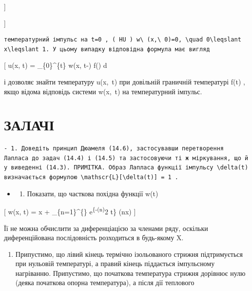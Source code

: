 \documentclass[
  ukrainian,
]{article}
\providecommand{\tightlist}{%
  \setlength{\itemsep}{0pt}\setlength{\parskip}{0pt}}
\begin{document}
{]}

{]}

\begin{verbatim}
температурний імпульс на t=0 , ( HU ) w\ (x,\ 0)=0, \quad 0\leqslant x\leqslant 1. У цьому випадку відповідна формула має вигляд
\end{verbatim}

{[} u(x, t) = \int\_\{0\}\^{}\{t\} w(x, t-\tau) f(\tau) d\tau {]}

і дозволяє знайти температуру u\left(x,~t\right) при довільній граничній
температурі f\left(t\right) , якщо відома відповідь системи
w\left(x,~t\right) на температурний імпульс.

\section{ЗАЛАЧІ}\label{ux437ux430ux43bux430ux447ux456}

\begin{verbatim}
- 1. Доведіть принцип Дюамеля (14.6), застосувавши перетворення Лапласа до задач (14.4) і (14.5) та застосовуючи ті ж міркування, що й у виведенні (14.3). ПРИМІТКА. Образ Лапласа функції імпульсу \delta(t) визначається формулою \mathscr{L}[\delta(t)] = 1 .
\end{verbatim}

\begin{itemize}
\tightlist
\item
  \begin{enumerate}
  \def\labelenumi{\arabic{enumi}.}
  \setcounter{enumi}{1}
  \tightlist
  \item
    Показати, що часткова похідна функції w(t)
  \end{enumerate}
\end{itemize}

{[} w(x, t) = x +  \sum\_\{n=1\}\^{}\{\infty\}
 e\textsuperscript{\{-(n\pi)}2 t\} \sin(n\pi x) {]}

Її не можна обчислити за диференціацією за членами ряду, оскільки
диференційована послідовність розходиться в будь-якому X.

\begin{enumerate}
\def\labelenumi{\arabic{enumi}.}
\setcounter{enumi}{2}
\tightlist
\item
  Припустимо, що лівий кінець термічно ізольованого стрижня
  підтримується при нульовій температурі, а правий кінець піддається
  імпульсному нагріванню. Припустимо, що початкова температура стрижня
  дорівнює нулю (деяка початкова опорна температура), а після дії
  теплового
\end{enumerate}
\end{document}
